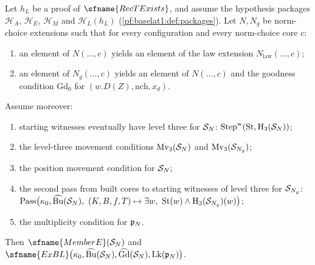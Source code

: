 \begin{theorem}\label{pf:baselat1:main}
Let $h_L$ be a proof of $\sfname{RecTExists}$, and assume the hypothesis packages $\mathcal H_A$, $\mathcal H_E$,
$\mathcal H_M$ and $\mathcal H_L(h_L)$ (\cref{pf:baselat1:def:packages}). Let $N,N_g$ be norm-choice extensions such
that for every configuration and every norm-choice core $c$:
\begin{enumerate}[label=(\alph*)]
\item an element of $N(\dots,c)$ yields an element of the law extension $N_{\mathrm{law}}(\dots,c)$;
\item an element of $N_g(\dots,c)$ yields an element of $N(\dots,c)$ and the goodness condition $\mathrm{Gd}_0$ for
  $(w.D(Z),\mathrm{nch},x_d)$.
\end{enumerate}
Assume moreover:
\begin{enumerate}[label=(\alph*),resume]
\item starting witnesses eventually have level three for $\mathcal S_N$:
  $\mathrm{Step}^{\mathrm w}(\mathrm{St},\mathrm H_3(\mathcal S_N))$;
\item the level-three movement conditions $\mathrm{Mv}_3(\mathcal S_N)$ and $\mathrm{Mv}_3(\mathcal S_{N_g})$;
\item the position movement condition for $\mathcal S_N$;
\item the second pass from built cores to starting witnesses of level three for $\mathcal S_{N_g}$:
  $\mathrm{Pass}\bigl(\kappa_0,\widehat{\mathrm{Bu}}(\baselatoneS_N),\ (K,B,f,T)\mapsto\exists w,\ \mathrm{St}(w)\wedge
  \mathrm H_3(\baselatoneS_{N_g})(w)\bigr)$;
\item the multiplicity condition for $\mathfrak p_N$.
\end{enumerate}
Then $\sfname{MemberE}(\baselatoneS_N)$ and
$\sfname{ExBL}\bigl(\kappa_0,\widehat{\mathrm{Bu}}(\baselatoneS_N),\widehat{\mathrm{Gd}}(\baselatoneS_N),
\mathrm{Lk}(\baselatoneP_N)\bigr)$.
\end{theorem}

